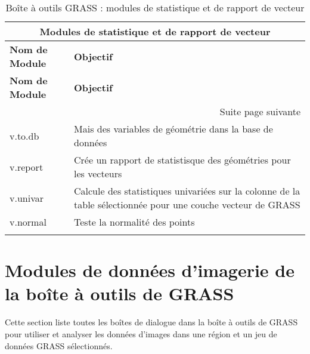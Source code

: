 \begin{center}
{\setlength{\extrarowheight}{10pt}
\small
\begin{longtable}{|p{4cm}|p{10cm}|}
  \hline \multicolumn{2}{|c|}{\textbf{Modules de statistique et de rapport de vecteur}}\\
\hline \textbf{Nom de Module}&\textbf{Objectif}\\
\endfirsthead
\hline \textbf{Nom de Module}&\textbf{Objectif}\\
\endhead
\hline \multicolumn{2}{|r|}{{Suite page suivante}} \\ \hline
\endfoot
\endlastfoot
  \hline v.to.db & Mais des variables de géométrie dans la base de données\\
  \hline v.report & Crée un rapport de statistisque des géométries pour les vecteurs\\
  \hline v.univar & Calcule des statistiques univariées sur la colonne de la table sélectionnée pour une couche vecteur de GRASS\\
  \hline v.normal & Teste la normalité des points\\
\hline
\caption{Boîte à outils GRASS : modules de statistique et de rapport de vecteur}
\end{longtable}}
\end{center} 

\section{Modules de données d'imagerie de la boîte à outils de GRASS}

Cette section liste toutes les boîtes de dialogue dans la boîte à outils de GRASS pour utiliser et analyser les données d'images dans une région et un jeu de données GRASS sélectionnés.

